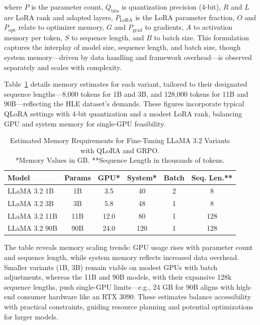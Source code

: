\documentclass{svproc}
\begin{document}
\noindent
where \(P\) is the parameter count, \(Q_{\text{bits}}\) is quantization precision (4-bit), \(R\) and \(L\) are LoRA rank and adapted layers, \(P_{\text{LoRA}}\) is the LoRA parameter fraction, \(O\) and \(P_{\text{opt}}\) relate to optimizer memory, \(G\) and \(P_{\text{grad}}\) to gradients, \(A\) to activation memory per token, \(S\) to sequence length, and \(B\) to batch size. This formulation captures the interplay of model size, sequence length, and batch size, though system memory—driven by data handling and framework overhead—is observed separately and scales with complexity.

Table~\ref{tab:memory_requirements} details memory estimates for each variant, tailored to their designated sequence lengths—8,000 tokens for 1B and 3B, and 128,000 tokens for 11B and 90B—reflecting the HLE dataset’s demands. These figures incorporate typical QLoRA settings with 4-bit quantization and a modest LoRA rank, balancing GPU and system memory for single-GPU feasibility.

\vspace{-\baselineskip}
\begin{table}[H]
  \centering
  \begin{tabular}{lccccc}
    \toprule
    \textbf{Model} & \textbf{Params} & \textbf{GPU*} & \textbf{System*} & \textbf{Batch} & \textbf{Seq. Len.**} \\
    \midrule
    LLaMA 3.2 1B & 1B & 3.5 & 40 & 2 & 8 \\
    LLaMA 3.2 3B & 3B & 5.8 & 48 & 1 & 8 \\
    LLaMA 3.2 11B & 11B & 12.0 & 80 & 1 & 128 \\
    LLaMA 3.2 90B & 90B & 24.0 & 120 & 1 & 128 \\
    \bottomrule
  \end{tabular}
  \vspace{0.5em}
  \caption{Estimated Memory Requirements for Fine-Tuning LLaMA 3.2 Variants with QLoRA and GRPO.\\
  *Memory Values in GB. **Sequence Length in thousands of tokens.}
  \label{tab:memory_requirements}
\end{table}
\vspace{-\baselineskip}

The table reveals memory scaling trends: GPU usage rises with parameter count and sequence length, while system memory reflects increased data overhead. Smaller variants (1B, 3B) remain viable on modest GPUs with batch adjustments, whereas the 11B and 90B models, with their expansive 128k sequence lengths, push single-GPU limits—e.g., 24 GB for 90B aligns with high-end consumer hardware like an RTX 3090. These estimates balance accessibility with practical constraints, guiding resource planning and potential optimizations for larger models.
\end{document}

